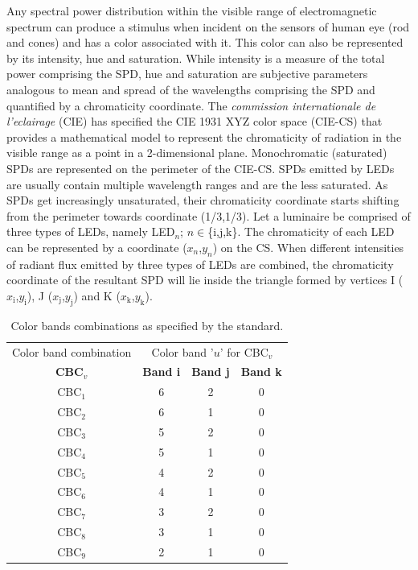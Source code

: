 \documentclass[10pt,letterpaper]{article}
\begin{document}
Any spectral power distribution within the visible range of
electromagnetic spectrum can produce a stimulus when incident on the
sensors of human eye (rod and cones) and has a color associated with
it. This color can also be represented by its intensity, hue and
saturation. While intensity is a measure of the total power comprising
the SPD, hue and saturation are subjective parameters analogous to
mean and spread of the wavelengths comprising the SPD and quantified
by a chromaticity coordinate. The \textit{commission internationale de
  l'eclairage} (CIE) has specified the CIE 1931 XYZ color space (CIE-CS)
that provides a mathematical model to represent the chromaticity of
radiation in the visible range as a point in a 2-dimensional
plane. {\color{red}Monochromatic (saturated) SPDs are represented on the perimeter of the CIE-CS. SPDs emitted by LEDs are usually contain multiple wavelength ranges and are the less saturated. As SPDs get increasingly unsaturated, their chromaticity coordinate starts shifting from the perimeter towards coordinate (1/3,1/3).} Let a luminaire be comprised of three types of LEDs, namely
LED$_{n}$; $n\in$\{i,j,k\}. The chromaticity of each LED can be
represented by a coordinate ($x_{n}$,$y_{n}$) on the CS. When
different intensities of radiant flux emitted by three types of LEDs
are combined, the chromaticity coordinate of the resultant SPD will
lie inside the triangle formed by vertices I ($x_{\text{i}}$,$y_{\text{i}}$), J
($x_{\text{j}}$,$y_{\text{j}}$) and K ($x_{\text{k}}$,$y_{\text{k}}$).

\begin{table}[b]
\centering
\begin{tabular}{|c|c|c|c|}
\hline
Color band combination & \multicolumn{3}{c|}{Color band '$u$' for CBC$_{v}$} \\
\cline{2-4}
\textbf{CBC$_{v}$} & \textbf{Band i} & \textbf{Band j} & \textbf{Band k} \\
\hline
CBC$_{1}$ & 6 & 2 & 0 \\
\hline
CBC$_{2}$ & 6 & 1 & 0 \\
\hline
CBC$_{3}$ & 5 & 2 & 0 \\
\hline
CBC$_{4}$ & 5 & 1 & 0 \\
\hline
CBC$_{5}$ & 4 & 2 & 0 \\
\hline
CBC$_{6}$ & 4 & 1 & 0 \\
\hline
CBC$_{7}$ & 3 & 2 & 0 \\
\hline
CBC$_{8}$ & 3 & 1 & 0 \\
\hline
CBC$_{9}$ & 2 & 1 & 0 \\
\hline
\end{tabular}
\caption{Color bands combinations as specified by the standard.}
\label{tCBC}
\end{table}
\end{document}
